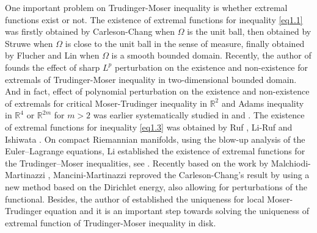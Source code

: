 \documentclass[11pt]{article}
\theoremstyle{plain}
\numberwithin{equation}{section}
\begin{document}
One important problem on Trudinger-Moser inequality is whether extremal functions exist or not. The existence of extremal functions for inequality \eqref{eq1.1} was firstly obtained by Carleson-Chang \cite{Carleson-Chang-1986} when $\Omega$ is the unit ball, then obtained by Struwe \cite{Struwe-1988} when $\Omega$ is close to the unit ball in the sense of measure, finally obtained by Flucher \cite{Flucher-1992} and Lin \cite{Lin-1996} when $\Omega$ is a smooth bounded domain.
Recently,
 the author of \cite{Chen-Jiang-Lu-Zhu-2025} founds the effect of sharp $L^{p}$ perturbation
 on the existence and non-existence for extremals of Trudinger-Moser inequality in two-dimensional bounded domain. And in fact, effect of polynomial perturbation on the existence and
 non-existence of extremals for critical Moser-Trudinger inequality in $\mathbb{R}^{2}$
 and Adams inequality in $\mathbb{R}^{4}$ or $\mathbb{R}^{2m}$ for $m>2$ was earlier systematically studied in \cite{Chen-Lu-Zhu-2020} and \cite{Chen-Lu-Zhu-2022}. The existence of extremal functions for inequality \eqref{eq1.3} was obtained by Ruf \cite{Ruf-2005}, Li-Ruf \cite{Li-Ruf-2008} and Ishiwata \cite{Ishiwata-2011}. On compact Riemannian manifolds, using the blow-up
analysis of the Euler--Lagrange equations, Li established the existence
of extremal functions for the Trudinger--Moser inequalities, see \cite{Li-2001,Li-2005,Li-2006}.  Recently based on the work by Malchiodi-Martinazzi \cite{Malchiodi-Martinazzi-2014}, Mancini-Martinazzi \cite{Mancini-Martinazzi-2017} reproved the Carleson-Chang's result by using a new method based on the Dirichlet energy, also allowing
for perturbations of the functional. Besides, the author of \cite{Chen-Lu-Xue-Zhu-2022} established the uniqueness for local Moser-Trudinger
 equation and it is an important step towards solving the uniqueness of extremal function of Trudinger-Moser inequality in disk.
\end{document}

